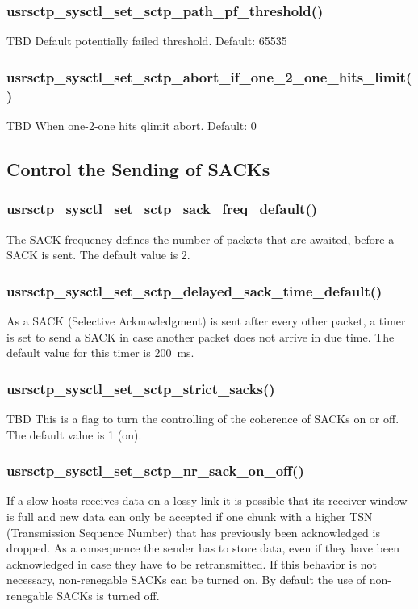 \documentclass[a4paper]{article}
\begin{document}
\subsubsection{usrsctp\_sysctl\_set\_sctp\_path\_pf\_threshold()}
TBD
Default potentially failed threshold. Default: 65535		

\subsubsection{usrsctp\_sysctl\_set\_sctp\_abort\_if\_one\_2\_one\_hits\_limit()}
TBD
When one-2-one hits qlimit abort. Default: 0

		
\subsection{Control the Sending of SACKs}
\subsubsection{usrsctp\_sysctl\_set\_sctp\_sack\_freq\_default()}
The SACK frequency defines the number of packets that are awaited, before a SACK is sent. 
The default value is 2.

\subsubsection{usrsctp\_sysctl\_set\_sctp\_delayed\_sack\_time\_default()}
As a SACK (Selective Acknowledgment) is sent after every other packet, a timer is set to send a
SACK in case another packet does not arrive in due time. The default value for this timer is
200~ms.

\subsubsection{usrsctp\_sysctl\_set\_sctp\_strict\_sacks()}
TBD
This is a flag to turn the controlling of the coherence of SACKs on or off. The default value is
1 (on).

\subsubsection{usrsctp\_sysctl\_set\_sctp\_nr\_sack\_on\_off()}
If a slow hosts receives data on a lossy link it is possible that its receiver window is full and new 
data can only be accepted if one chunk with a higher TSN (Transmission Sequence Number) that has 
previously been acknowledged is dropped. As a consequence the sender has to store data, even if
they have been acknowledged in case they have to be retransmitted. If this behavior is not necessary,
non-renegable SACKs can be turned on. 
By default the use of non-renegable SACKs is turned off.
\end{document}
